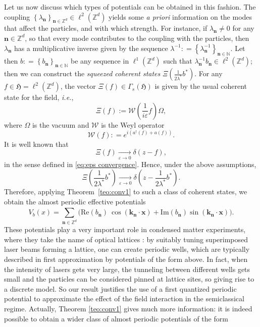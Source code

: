 \documentclass[11pt,a4paper,reqno]{amsart}
\renewcommand{\Im}{\mathrm{Im}}
\renewcommand{\Re}{\mathrm{Re}}
\theoremstyle{definition}
\numberwithin{equation}{section}
\newcommand{\bdm}{\begin{displaymath}}
\newcommand{\edm}{\end{displaymath}}
\newcommand{\beq}{\begin{equation}}
\newcommand{\eeq}{\end{equation}}
\newcommand{\tx}{\textstyle}
\newcommand{\lf}{\left}
\newcommand{\ri}{\right}
\newcommand{\xv}{\mathbf{x}}
\newcommand{\kv}{\mathbf{k}}
\newcommand{\nv}{\mathbf{n}}
\newcommand{\eps}{\varepsilon}
\newcommand{\Z}{\mathbb{Z}}
\newcommand{\N}{\mathbb{N}}
\newcommand{\hh}{\mathfrak{H}}
\newcommand{\WW}{\mathcal{W}}
\begin{document}
Let us now discuss which types of potentials can be obtained in this fashion. The coupling $ \lf\{ \lambda_{\nv} \ri\}_{\nv \in \Z^d} \in \ell^2(\mathbb{Z}^d)$ yields some
\emph{a priori} information on the modes that affect the particles, and with which strength. For instance, if $ \lambda_{\nv}  \neq 0$ for any $ \nv \in \mathbb{Z}^d$, so that every mode contributes to the coupling with
the particles, then $\lambda_{\nv} $ has a multiplicative inverse given by the sequence $ \lambda^{-1} : = \lf\{ \lambda_{\nv}^{-1} \ri\}_{\nv \in \N}$. Let then $ b : = \lf\{ b_{\nv} \ri\}_{\nv \in \N} $ be any sequence in $ \ell^1(\Z^d) $ such that $ \lambda^{-1}_{\nv} b_{\nv} \in \ell^2(\Z^d) $; then we can construct the {\it squeezed coherent states} $ \Xi\lf( \frac{1}{2 \lambda^*} b^{*}\ri) $. For any $ f \in \hh = \ell^2(\Z^d) $, the vector $ \Xi(f)\in \Gamma_s(\hh)$ is given by the usual coherent state for the field, {\it i.e.},
\begin{equation}
	\label{eq:coherent}
  	\Xi(f) := \WW\lf( \tx\frac{1}{i\eps} f\ri)\Omega,
\end{equation}
where $ \Omega $ is the vacuum and $ \WW $ is the Weyl operator
\beq
	\label{eq:weyl}
	\WW(f) : = e^{i \lf( a^{\dagger}(f) + a(f) \ri)}.
\eeq
It is well known \cite[Theorem 4.2]{ammari:nier:2008} that 
\beq
	\label{eq:coherent convergence}
	\Xi(f) \xrightarrow[\eps \to 0]{} \delta\lf(z - f\ri),
\eeq
in the sense defined in \eqref{eq:eps convergence}. Hence, under the above assumptions,
\bdm
	\Xi\lf(\tx\frac{1}{2 \lambda^*} b^{*}\ri) \xrightarrow[\eps \to 0]{} \delta \lf(z - \tx\frac{1}{2 \lambda^{*}} b^*  \ri).
\edm
Therefore, applying Theorem~\ref{teo:conv1} to such a class of coherent states, we obtain the almost periodic
effective potentials
\begin{equation}
  \label{eq:23}
  V_{b}(x)=\sum_{\nv \in \mathbb{Z}^d}^{} \bigl( \Re (b_{\nv}) \: \cos(\kv_{\nv} \cdot \xv) + \Im (b_{\nv})  \sin(\kv_{\nv} \cdot \xv) \bigr).
\end{equation}
These potentials play a very important role in condensed matter experiments, where they take the name of optical lattices \cite{PhysRevA.50.5173,bloch:05}: by suitably tuning superimposed laser beams forming a lattice, one can create periodic wells, which are typically described in first approximation by potentials of the form above. In fact, when the intensity of lasers gets very large, the tunneling between different wells gets small and the particles can be considered pinned at lattice sites, so giving rise to a discrete model. So our result justifies the use of a first quantized periodic potential to approximate the effect of the field interaction in the semiclassical regime. Actually, Theorem \ref{teo:conv1} gives much more information: it is indeed possible to obtain a wider class of almost periodic potentials of the form
\end{document}
